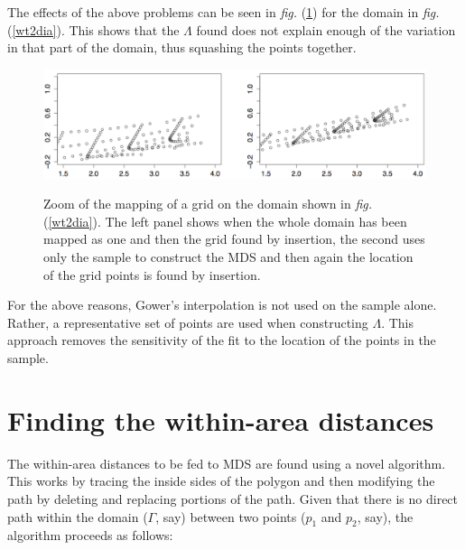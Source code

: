 \documentclass[a4paper,10pt]{amsart}
\newcommand{\fig}[1]{\emph{fig.} (\ref{#1})}
\begin{document}
The effects of the above problems can be seen in \fig{wt2zoom} for the domain in \fig{wt2dia}. This shows that the $\Lambda$ found does not explain enough of the variation in that part of the domain, thus squashing the points together.

\begin{figure}
\centering
\includegraphics[width=5in]{figs/wt2-zoom.pdf}\\
\caption{Zoom of the mapping of a grid on the domain shown in \fig{wt2dia}. The left panel shows when the whole domain has been mapped as one and then the grid found by insertion, the second uses only the sample to construct the MDS and then again the location of the grid points is found by insertion.}
\label{wt2zoom}
\end{figure}


For the above reasons, Gower's interpolation is not used on the sample alone. Rather, a representative set of points are used when constructing $\Lambda$. This approach removes the sensitivity of the fit to the location of the points in the sample.





\section{Finding the within-area distances}

The within-area distances to be fed to MDS are found using a novel algorithm. This works by tracing the inside sides of the polygon and then modifying the path by deleting and replacing portions of the path. Given that there is no direct path within the domain ($\Gamma$, say) between two points ($p_1$ and $p_2$, say), the algorithm proceeds as follows:
\end{document}
